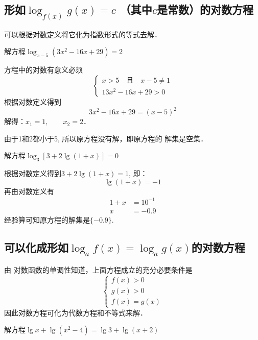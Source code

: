 \subsection{形如$\log_{f(x)}g(x)=c$\; （其中$c$是常数）的对数方程}

可以根据对数定义将它化为指数形式的等式去解．



\begin{example}
    解方程$\log_{x-5}(3x^2-16x+29)=2$
\end{example}

\begin{solution}
  方程中的对数有意义必须
  \[\begin{cases}
    x>5\quad\text{且}\quad  x-5\ne 1 \\
    13x^2-16x+29>0
  \end{cases}\] 
  根据对数定义得到
 \[ 3x^2-16x+29=(x-5)^2\]
  解得：$x_1=1,\qquad x_2=2$．

  由于1和2都小于5, 所以原方程没有解，即原方程的
  解集是空集．
\end{solution}


\begin{example}
    解方程$\log_3[3+2\lg(1+x)]=0$
\end{example}

\begin{solution}
  根据对数定义得到$3+2\lg(1+x)=1$,
  即：
  \[  \lg(1+x)=-1\]
  再由对数定义有
\[\begin{split}
  1+x&=10^{-1}\\
  x&=-0.9
\end{split}\]  
  经验算可知原方程的解集是$\{-0.9\}$.
\end{solution}

\subsection{可以化成形如$\log_a f(x)=\log_a g(x)$的对数方程}

由
对数函数的单调性知道，上面方程成立的充分必要条件是
\[\begin{cases}
  f(x)>0\\
  g(x)>0\\
  f(x)=g(x)
\end{cases}\]
因此对数方程可化为代数方程和不等式来解．

\begin{example}
  解方程$\lg x+\lg(x^2-4)=\lg3+\lg(x+2)$
\end{example}

